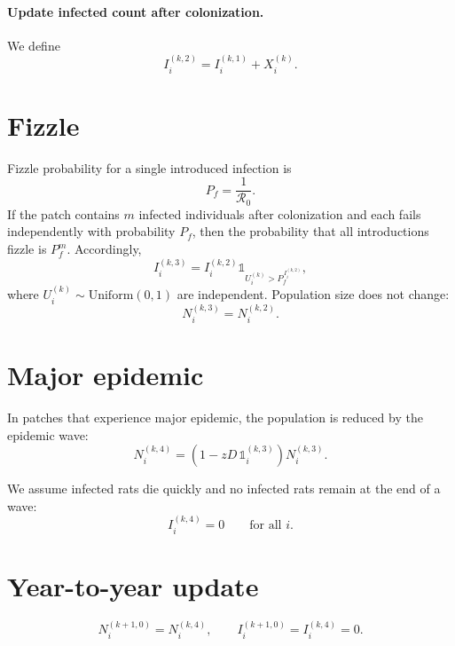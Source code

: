 \documentclass[12pt]{article}
\begin{document}
\paragraph{Update infected count after colonization.}
We define
\begin{equation}
I_i^{(k,2)} = I_i^{(k,1)} + X_i^{(k)}.
\end{equation}

\section{Fizzle}
Fizzle probability for a single introduced infection is
\begin{equation}
P_f=\frac{1}{\mathcal{R}_0}.
\end{equation}
If the patch contains $m$ infected individuals after colonization and each fails independently with probability $P_f$, then the probability that all introductions fizzle is $P_f^{m}$.
Accordingly,
\begin{equation}
I_i^{(k,3)} = I_i^{(k,2)}\mathds{1}_{U_i^{(k)} > P_f^{\,I_i^{(k,2)}}},
\end{equation}
where $U_i^{(k)}\sim \mathrm{Uniform}(0,1)$ are independent.
Population size does not change:
\begin{equation}
N_i^{(k,3)} = N_i^{(k,2)}.
\end{equation}

\section{Major epidemic}
In patches that experience major epidemic, the population is reduced by the epidemic wave:
\begin{equation}
N_i^{(k,4)}=\left(1-zD\,\mathds{1}_i^{(k,3)}\right)N_i^{(k,3)}.
\end{equation}

We assume infected rats die quickly and no infected rats remain at the end of a wave:
\begin{equation}
I_i^{(k,4)} = 0 \qquad \text{for all } i.
\end{equation}

\section{Year-to-year update}
\begin{equation}
N_i^{(k+1,0)} = N_i^{(k,4)},\qquad
I_i^{(k+1,0)} = I_i^{(k,4)}=0.
\end{equation}
\end{document}
